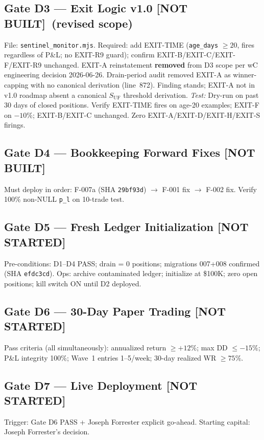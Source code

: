 \documentclass[11pt,a4paper]{article}
\newcommand{\statusnotbuilt}{\textcolor{statusnotbuilt}{\textbf{[NOT BUILT]}}}
\newcommand{\statusnotstarted}{\textcolor{tfegray}{\textbf{[NOT STARTED]}}}
\newcommand{\code}[1]{\texttt{\small#1}}
\newcommand{\sha}[1]{\texttt{\footnotesize#1}}
\begin{document}
\subsection*{Gate D3 — Exit Logic v1.0 \hfill \statusnotbuilt\ (revised scope)}
File: \texttt{sentinel\_monitor.mjs}. Required: add EXIT-TIME (\texttt{age\_days} $\geq 20$, fires regardless of P\&L; no EXIT-R9 guard); confirm EXIT-B/EXIT-C/EXIT-F/EXIT-R9 unchanged.\newline
EXIT-A reinstatement \textbf{removed} from D3 scope per wC engineering decision 2026-06-26. Drain-period audit removed EXIT-A as winner-capping with no canonical derivation (line~872). Finding stands; EXIT-A not in v1.0 roadmap absent a canonical $S_{\text{UF}}$ threshold derivation.\newline
\textit{Test:} Dry-run on past 30 days of closed positions. Verify EXIT-TIME fires on age-20 examples; EXIT-F on $-10\%$; EXIT-B/EXIT-C unchanged. Zero EXIT-A/EXIT-D/EXIT-H/EXIT-S firings.

\subsection*{Gate D4 — Bookkeeping Forward Fixes \hfill \statusnotbuilt}
Must deploy in order: F-007a (SHA \sha{29bf93d}) $\to$ F-001 fix $\to$ F-002 fix. Verify 100\% non-NULL \code{p\_l} on 10-trade test.

\subsection*{Gate D5 — Fresh Ledger Initialization \hfill \statusnotstarted}
Pre-conditions: D1--D4 PASS; drain = 0 positions; migrations 007+008 confirmed (SHA \sha{efdc3cd}).\newline
Ops: archive contaminated ledger; initialize at \$100K; zero open positions; kill switch ON until D2 deployed.

\subsection*{Gate D6 — 30-Day Paper Trading \hfill \statusnotstarted}
Pass criteria (all simultaneously): annualized return $\geq +12\%$; max DD $\leq -15\%$; P\&L integrity 100\%; Wave~1 entries 1--5/week; 30-day realized WR $\geq 75\%$.

\subsection*{Gate D7 — Live Deployment \hfill \statusnotstarted}
Trigger: Gate D6 PASS + Joseph Forrester explicit go-ahead. Starting capital: Joseph Forrester's decision.
\end{document}
